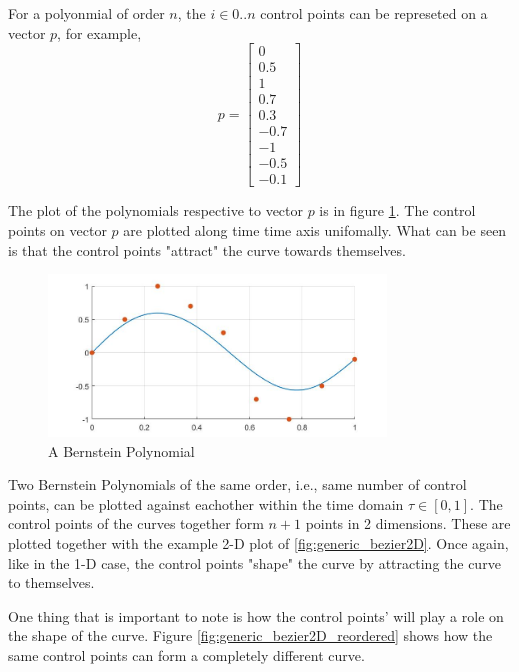 \par For a polyonmial of order $n$, the $i \in {0 .. n}$ control points can be represeted on a vector $p$, for example,
\begin{equation}
    p = \begin{bmatrix}0\\ 0.5\\ 1\\ 0.7\\ 0.3\\ -0.7\\ -1\\ -0.5\\ -0.1\end{bmatrix}
\end{equation}
\par The plot of the polynomials respective to vector $p$ is in figure \ref{fig:generic_bezier}. The control points on vector $p$ are plotted along time time axis unifomally. What can be seen is that the control points "attract" the curve towards themselves.

\begin{figure}[h!]
\centering
\includegraphics[width=0.8\textwidth]{Images/generic_bezier.jpg}
\caption{A Bernstein Polynomial}
\label{fig:generic_bezier}
\end{figure}


\par Two Bernstein Polynomials of the same order, i.e., same number of control points, can be plotted against eachother within the time domain $\tau \in [0,1]$. The control points of the curves together form $n+1$ points in 2 dimensions. These are plotted together with the example 2-D plot of \ref{fig:generic_bezier2D}. Once again, like in the 1-D case, the control points "shape" the curve by attracting the curve to themselves.
\par One thing that is important to note is how the control points'  will play a role on the shape of the curve. Figure \ref{fig:generic_bezier2D_reordered} shows how the same control points can form a completely different curve.

